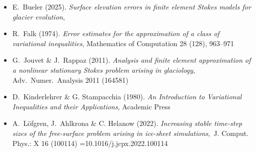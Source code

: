 
\begin{itemize}
\item E.~Bueler (2025). \emph{Surface elevation errors in finite element {S}tokes models for glacier evolution}, 
\item R.~Falk (1974).  \emph{Error estimates for the approximation of a class of variational inequalities}, Mathematics of Computation 28 (128), 963--971
\item G.~Jouvet \& J.~Rappaz (2011). \emph{Analysis and finite element approximation of a nonlinear stationary {S}tokes problem arising in glaciology}, Adv.~Numer.~Analysis 2011 (164581) 
\item D.~Kinderlehrer \& G. Stampacchia (1980). \emph{An {I}ntroduction to {V}ariational {I}nequalities and their {A}pplications}, Academic Press
\item A.~L{\"o}fgren, J.~Ahlkrona \& C. Helanow (2022). \emph{Increasing stable time-step sizes of the free-surface problem arising in ice-sheet simulations},~J. Comput. Phys.: X 16 (100114) \sdoi={10.1016/j.jcpx.2022.100114}
\end{itemize}
